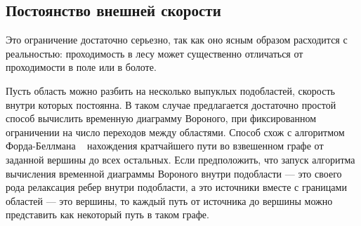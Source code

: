 \documentclass[12pt]{article}
\begin{document}
\subsection{Постоянство внешней скорости}
\label{multi_type}
Это ограничение достаточно серьезно, так как оно ясным образом расходится с 
реальностью: проходимость в лесу может существенно отличаться от проходимости 
в поле или в болоте. 

Пусть область можно разбить на несколько выпуклых подобластей, скорость внутри которых
постоянна. В таком случае предлагается достаточно простой способ вычислить временную
диаграмму Вороного, при фиксированном ограничении на число переходов между областями.
Способ схож с алгоритмом Форда-Беллмана ~\cite{cormen} нахождения 
кратчайшего пути во взвешенном графе от заданной вершины до всех остальных. 
Если предположить, что запуск алгоритма вычисления временной диаграммы Вороного 
внутри подобласти --- это своего рода релаксация ребер внутри подобласти, 
а это источники вместе с границами областей
--- это вершины, то каждый путь от источника до вершины можно представить
как некоторый путь в таком графе. 
\end{document}
